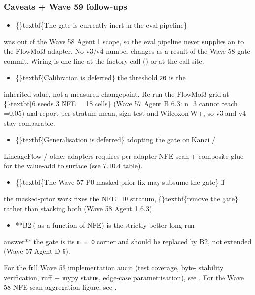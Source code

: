 \documentclass{article}
\begin{document}
\subsubsection{Caveats + Wave 59 follow-ups}
\begin{itemize}
\item \{\}textbf\{The gate is currently inert in the eval pipeline\} 
\end{itemize}
 was out of the Wave 58 Agent 1 scope, so the eval pipeline never supplies an  to the FlowMol3 adapter. No v3/v4 number changes as a result of the Wave 58 gate commit. Wiring is one line at the  factory call () or at the  call site.

\begin{itemize}
\item \{\}textbf\{Calibration is deferred\}  the threshold \texttt{20} is the
\end{itemize}
inherited value, not a measured changepoint. Re-run the FlowMol3 grid at \{\}textbf\{6 seeds  3 NFE = 18 cells\} (Wave 57 Agent B 6.3: n=3 cannot reach =0.05) and report per-stratum mean, sign test and Wilcoxon W+, so v3 and v4 stay comparable.

\begin{itemize}
\item \{\}textbf\{Generalisation is deferred\}  adopting the gate on Kanzi /
\end{itemize}
LineageFlow / other adapters requires per-adapter NFE scan + composite glue for the value-add to surface (see 7.10.4 table).

\begin{itemize}
\item \{\}textbf\{The Wave 57 P0 masked-prior fix may subsume the gate\}  if
\end{itemize}
the masked-prior work fixes the NFE=10 stratum, \{\}textbf\{remove the gate\} rather than stacking both (Wave 58 Agent 1 6.3).

\begin{itemize}
\item **B2 ( as a function of NFE) is the strictly better long-run
\end{itemize}
answer**  the gate is its \texttt{m = 0} corner and should be replaced by B2, not extended (Wave 57 Agent D 6).

For the full Wave 58 implementation audit (test coverage, byte- stability verification, ruff + mypy status, edge-case parametrisation), see . For the Wave 58 NFE scan aggregation figure, see .
\end{document}
